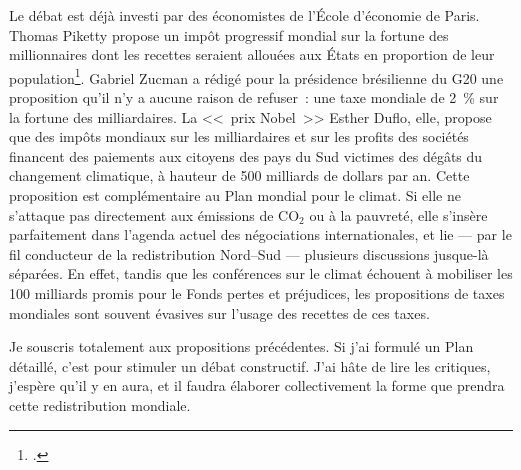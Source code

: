\documentclass[a5paper,french,openany]{memoir}
\begin{document}
Le débat est déjà investi par des économistes de l'École d'économie de Paris. Thomas Piketty propose un impôt progressif mondial sur la fortune des millionnaires dont les recettes seraient allouées aux États en proportion de leur population\footnote{\citet{piketty_breve_2021}.}. 
Gabriel Zucman a rédigé pour la présidence brésilienne du G20 une proposition qu'il n'y a aucune raison de refuser~: une taxe mondiale de 2~\% sur la fortune des milliardaires. %
La <<~prix Nobel~>> Esther Duflo, elle, propose que des impôts mondiaux sur les milliardaires et sur les profits des sociétés financent des paiements aux citoyens des pays du Sud victimes des dégâts du changement climatique, à hauteur de 500 milliards de dollars par an. Cette proposition est complémentaire au Plan mondial pour le climat. Si elle ne s'attaque pas directement aux émissions de CO$_\text{2}$ ou à la pauvreté, elle s'insère parfaitement dans l'agenda actuel des négociations internationales, et lie --- par le fil conducteur de la redistribution Nord--Sud --- plusieurs discussions jusque-là séparées. En effet, tandis que les conférences sur le climat échouent à mobiliser les 100 milliards promis pour le Fonds pertes et préjudices, les propositions de taxes mondiales sont souvent évasives sur l'usage des recettes de ces taxes. 

Je souscris totalement aux propositions précédentes. Si j'ai formulé un Plan détaillé, c'est pour stimuler un débat constructif. J'ai hâte de lire les critiques, j'espère qu'il y en aura, et il faudra élaborer collectivement la forme que prendra cette redistribution mondiale. 
\end{document}
